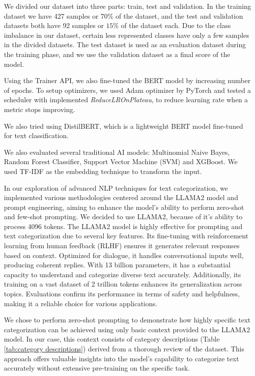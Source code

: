 \documentclass[fleqn,moreauthors,10pt]{ds_report}
\begin{document}
We divided our dataset into three parts: train, test and validation. In the training dataset we have 427 samples or $70\%$ of the dataset, and the test and validation datasets both have 92 samples or $15\%$ of the dataset each. Due to the class imbalance in our dataset, certain less represented classes have only a few samples in the divided datasets. The test dataset is used as an evaluation dataset during the training phase, and we use the validation dataset as a final score of the model.

Using the Trainer API, we also fine-tuned the BERT model by increasing number of epochs. To setup optimizers, we used Adam optimizer by PyTorch and tested a scheduler with implemented \textit{ReduceLROnPlateau}, to reduce learning rate when a metric stops improving.

We also tried using DistilBERT\cite{sanh2020distilbert}, which is a lightweight BERT model fine-tuned for text classification.

We also evaluated several traditional AI models: Multinomial Naive Bayes, Random Forest Classifier, Support Vector Machine (SVM) and XGBoost. We used TF-IDF as the embedding technique to transform the input.   

In our exploration of advanced NLP techniques for text categorization, we implemented various methodologies centered around the LLAMA2 model \cite{touvron2023llama} and prompt engineering, aiming to enhance the model's ability to perform zero-shot and few-shot prompting. We decided to use LLAMA2, because of it's ability to process 4096 tokens. The LLAMA2 model is highly effective for prompting and text categorization due to several key features. Its fine-tuning with reinforcement learning from human feedback (RLHF) ensures it generates relevant responses based on context. Optimized for dialogue, it handles conversational inputs well, producing coherent replies. With 13 billion parameters, it has a substantial capacity to understand and categorize diverse text accurately. Additionally, its training on a vast dataset of 2 trillion tokens enhances its generalization across topics. Evaluations confirm its performance in terms of safety and helpfulness, making it a reliable choice for various applications.

We chose to perform zero-shot prompting to demonstrate how highly specific text categorization can be achieved using only basic context provided to the LLAMA2 model. In our case, this context consists of category descriptions (Table \ref{tab:category descriptions}) derived from a thorough review of the dataset. This approach offers valuable insights into the model's capability to categorize text accurately without extensive pre-training on the specific task.
\end{document}
